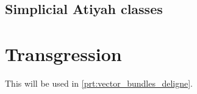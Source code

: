 
    \subsection{Simplicial Atiyah classes} %
    \label{sub:simplicial_atiyah_classes}
    


\section{Transgression} %
    \label{sec:transgression}

    This will be used in \cref{prt:vector_bundles_deligne}.


